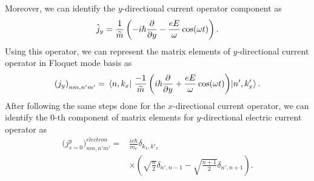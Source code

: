 \documentclass[
 reprint,
 amsmath,amssymb,
 aps,
 prb,
]{revtex4-2}
\begin{document}
\begin{appendix}
Moreover, we can identify the $y$-directional current operator component as
\begin{equation} \label{eq:d12}
  \hat{j}_y = \frac{1}{\widetilde{m}} \left(-i\hbar\pdv{y} - \frac{eE}{\omega}\cos(\omega t) \right).
\end{equation}
Using this operator, we can represent the matrix elements of $y$-directional current operator in Floquet mode basis as
\begin{equation} \label{eq:d13}
  \left({j}_y \right)_{nm,n'm'} =
  \mel{n,k_x}{\;\frac{-1}{\widetilde{m}} \left(i\hbar\pdv{y} + \frac{eE}{\omega}\cos(\omega t) \right)}{n',k'_x}.
\end{equation}
After following the same steps done for the $x$-directional current operator, we can identify the $0$-th component of matrix elements for $y$-directional electric current operator as
\begin{equation} \label{eq:d14}
  \begin{aligned}
    \Big({j}^y_{s=0}\Big)_{nm,n'm'}^{electron} = &
    \frac{ie\hbar}{{m_e}}
    \delta_{k_x,k'_x} \\
    & \times
    \left(
    \sqrt{\frac{n}{2}} \delta_{n',n-1}
    - \sqrt{\frac{n+1}{2}} \delta_{n',n+1}
    \right).
  \end{aligned}
\end{equation}
\end{appendix}


\end{document}
